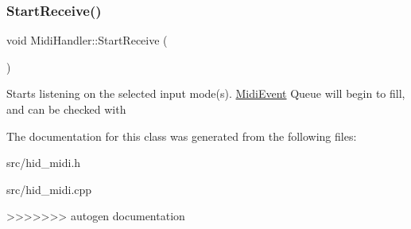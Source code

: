 \subsubsection{\texorpdfstring{Start\+Receive()}{StartReceive()}}
{\footnotesize\ttfamily void Midi\+Handler\+::\+Start\+Receive (\begin{DoxyParamCaption}{ }\end{DoxyParamCaption})}

Starts listening on the selected input mode(s). \hyperlink{structdaisy_1_1_midi_event}{Midi\+Event} Queue will begin to fill, and can be checked with 

The documentation for this class was generated from the following files\+:\begin{DoxyCompactItemize}
\item 
src/hid\+\_\+midi.\+h\item 
src/hid\+\_\+midi.\+cpp\end{DoxyCompactItemize}
>>>>>>> autogen documentation
